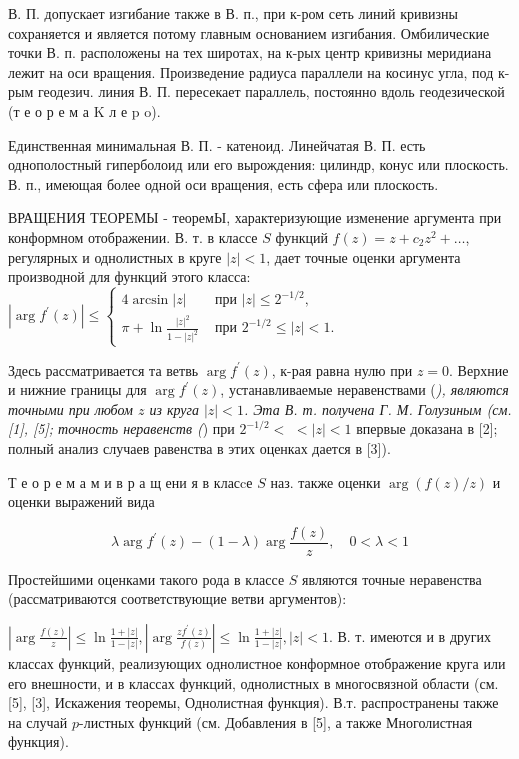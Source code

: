 \documentclass[10pt]{article}
\begin{document}
В. П. допускает изгибание также в В. п., при к-ром сеть линий кривизны сохраняется и является потому главным основанием изгибания. Омбилические точки В. п. расположены на тех широтах, на к-рых центр кривизны меридиана лежит на оси вращения. Произведение радиуса параллели на косинус угла, под к-рым геодезич. линия В. П. пересекает параллель, постоянно вдоль геодезической (т е о р е м а $\mathrm{K}$ л е p o).



Единственная минимальная В. П. - катеноид. Линейчатая В. П. есть однополостный гиперболоид или его вырождения: цилиндр, конус или плоскость. В. п., имеющая более одной оси вращения, есть сфера или плоскость.



ВРАЩЕНИЯ ТЕОРЕМЫ - теоремЫ, характеризующие изменение аргумента при конформном отображении. В. т. в классе $S$ функций $f(z)=z+c_{2} z^{2}+\ldots$, регулярных и однолистных в круге $|z|<1$, дает точные оценки аргумента производной для функций этого класса: $\left|\arg f^{\prime}(z)\right| \leqslant \begin{cases}4 \arcsin |z| & \text { при }|z| \leqslant 2^{-1 / 2}, \\ \pi+\ln \frac{|z|^{2}}{1-|z|^{2}} & \text { при } 2^{-1 / 2} \leqslant|z|<1 .\end{cases}$



Здесь рассматривается та ветвь $\arg f^{\prime}(z)$, к-рая равна нулю при $z=0$. Верхние и нижние границы для $\arg f^{\prime}(z)$, устанавливаемые неравенствами (\textit{), являются точными при любом $z$ из круга $|z|<1$. Эта В. т. получена Г. М. Голузиным (см. [1], [5]; точность неравенств (}) при $2^{-1 / 2}<$ $<|z|<1$ впервые доказана в [2]; полный анализ случаев равенства в этих оценках дается в [3]).



Т е о р е м а м и в р а щ ени я в класcе $S$ наз. также оценки $\arg (f(z) / z)$ и оценки выражений вида



\[

\lambda \arg f^{\prime}(z)-(1-\lambda) \arg \frac{f(z)}{z}, \quad 0<\lambda<1

\]



Простейшими оценками такого рода в классе $S$ являются точные неравенства (рассматриваются соответствующие ветви аргументов):



$\left|\arg \frac{f(z)}{z}\right| \leqslant \ln \frac{1+|z|}{1-|z|},\left|\arg \frac{z f^{\prime}(z)}{f(z)}\right| \leqslant \ln \frac{1+|z|}{1-|z|},|z|<1$. В. т. имеются и в других классах функций, реализующих однолистное конформное отображение круга или его внешности, и в классах функций, однолистных в многосвязной области (см. [5], [3], Искажения теоремы, Однолистная функция). В.т. распространены также на случай $p$-листных функций (см. Добавления в [5], а также Многолистная функция).
\end{document}
